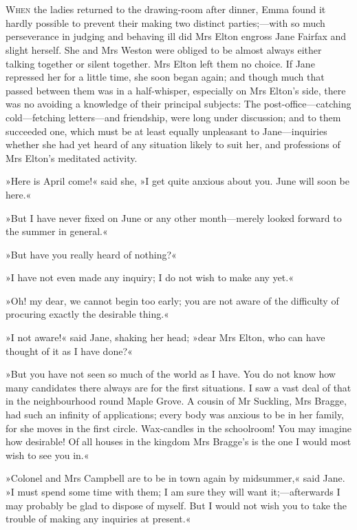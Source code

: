 \chapter[Chapter \thechapter]{}
\lettrine[lines=4,lraise=0.35]{W}{hen} the ladies returned to the drawing-room after dinner, Emma found it hardly possible to prevent their making two distinct parties;—with so much perseverance in judging and behaving ill did Mrs Elton engross Jane Fairfax and slight herself. She and Mrs Weston were obliged to be almost always either talking together or silent together. Mrs Elton left them no choice. If Jane repressed her for a little time, she soon began again; and though much that passed between them was in a half-whisper, especially on Mrs Elton's side, there was no avoiding a knowledge of their principal subjects: The post-office—catching cold—fetching letters—and friendship, were long under discussion; and to them succeeded one, which must be at least equally unpleasant to Jane—inquiries whether she had yet heard of any situation likely to suit her, and professions of Mrs Elton's meditated activity.

»Here is April come!« said she, »I get quite anxious about you. June will soon be here.«

»But I have never fixed on June or any other month—merely looked forward to the summer in general.«

»But have you really heard of nothing?«

»I have not even made any inquiry; I do not wish to make any yet.«

»Oh! my dear, we cannot begin too early; you are not aware of the difficulty of procuring exactly the desirable thing.«

»I not aware!« said Jane, shaking her head; »dear Mrs Elton, who can have thought of it as I have done?«

»But you have not seen so much of the world as I have. You do not know how many candidates there always are for the first situations. I saw a vast deal of that in the neighbourhood round Maple Grove. A cousin of Mr Suckling, Mrs Bragge, had such an infinity of applications; every body was anxious to be in her family, for she moves in the first circle. Wax-candles in the schoolroom! You may imagine how desirable! Of all houses in the kingdom Mrs Bragge's is the one I would most wish to see you in.«

»Colonel and Mrs Campbell are to be in town again by midsummer,« said Jane. »I must spend some time with them; I am sure they will want it;—afterwards I may probably be glad to dispose of myself. But I would not wish you to take the trouble of making any inquiries at present.«

